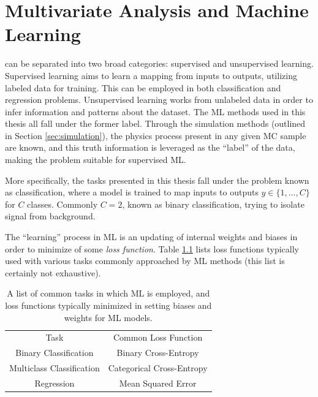 
\chapter{Multivariate Analysis and Machine Learning}
\label{app:MVA}

 can be separated into two broad categories: supervised and unsupervised learning. Supervised learning aims to learn a mapping from inputs to outputs, utilizing labeled data for training. This can be employed in both classification and regression problems. Unsupervised learning works from unlabeled data in order to infer information and patterns about the dataset. The \gls{ML} methods used in this thesis all fall under the former label. Through the simulation methods (outlined in Section \ref{sec:simulation}), the physics process present in any given \gls{MC} sample are known, and this truth information is leveraged as the ``label'' of the data, making the problem suitable for supervised \gls{ML}.

More specifically, the tasks presented in this thesis fall under the problem known as classification, where a model is trained to map inputs to outputs $y \in \{1,...,C\}$ for $C$ classes. Commonly $C=2$, known as binary classification, trying to isolate signal from background.

The ``learning'' process in \gls{ML} is an updating of internal weights and biases in order to minimize of some \textit{loss function}. Table \ref{tab:loss-functions} lists loss functions typically used with various tasks commonly approached by \gls{ML} methods (this list is certainly not exhaustive).

\begin{table}[!ht]
    \centering
    \caption[A list of common tasks in which \gls{ML} is employed, and loss functions typically used.]{A list of common tasks in which \gls{ML} is employed, and loss functions typically minimized in setting biases and weights for \gls{ML} models.}
    \begin{tabular}{c|c}
        Task                  & Common Loss Function \\
        \cline{1-2}
        Binary Classification     & Binary Cross-Entropy\\
        Multiclass Classification & Categorical Cross-Entropy\\
        Regression                & Mean Squared Error
    \end{tabular}  
    \label{tab:loss-functions}
\end{table}

